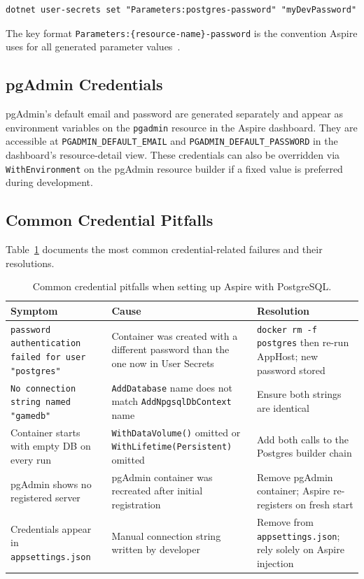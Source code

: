 \begin{lstlisting}
dotnet user-secrets set "Parameters:postgres-password" "myDevPassword"
\end{lstlisting}

The key format \texttt{Parameters:\{resource-name\}-password} is the convention Aspire uses for all generated parameter values~\cite{aspiredocs2024}.

\subsection{pgAdmin Credentials}

pgAdmin's default email and password are generated separately and appear as environment variables on the \texttt{pgadmin} resource in the Aspire dashboard. They are accessible at \texttt{PGADMIN\_DEFAULT\_EMAIL} and \texttt{PGADMIN\_DEFAULT\_PASSWORD} in the dashboard's resource-detail view. These credentials can also be overridden via \texttt{WithEnvironment} on the pgAdmin resource builder if a fixed value is preferred during development.

\subsection{Common Credential Pitfalls}

Table~\ref{tab:credential-pitfalls} documents the most common credential-related failures and their resolutions.

\begin{table}[H]
\centering
\caption{Common credential pitfalls when setting up Aspire with PostgreSQL.}
\label{tab:credential-pitfalls}
\small
\renewcommand{\arraystretch}{1.15}
\begin{tabularx}{\textwidth}{@{}>{\raggedright\arraybackslash}p{4cm} >{\raggedright\arraybackslash}X >{\raggedright\arraybackslash}p{3.5cm}@{}}
\toprule
\textbf{Symptom} & \textbf{Cause} & \textbf{Resolution} \\
\midrule
\texttt{password authentication failed for user "postgres"} & Container was created with a different password than the one now in User Secrets & \texttt{docker rm -f postgres} then re-run AppHost; new password stored \\
\addlinespace
\texttt{No connection string named "gamedb"} & \texttt{AddDatabase} name does not match \texttt{AddNpgsqlDbContext} name & Ensure both strings are identical \\
\addlinespace
Container starts with empty DB on every run & \texttt{WithDataVolume()} omitted or \texttt{WithLifetime(Persistent)} omitted & Add both calls to the Postgres builder chain \\
\addlinespace
pgAdmin shows no registered server & pgAdmin container was recreated after initial registration & Remove pgAdmin container; Aspire re-registers on fresh start \\
\addlinespace
Credentials appear in \texttt{appsettings.json} & Manual connection string written by developer & Remove from \texttt{appsettings.json}; rely solely on Aspire injection \\
\bottomrule
\end{tabularx}
\end{table}

